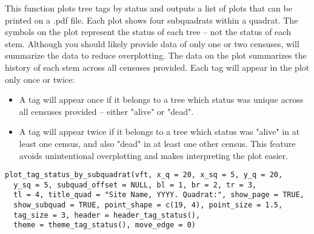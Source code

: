 \documentclass[a4paper]{book}
\begin{document}
\begin{Description}\relax
This function plots tree tags by status and outputs a list of plots that can
be printed on a .pdf file. Each plot shows four subquadrats within a quadrat.
The symbols on the plot represent the status of each tree -- not the status of
each stem. Although you should likely provide data of only one or two
censuses,  will summarize the data to reduce
overplotting. The data on the plot summarizes the history of each stem across
all censuses provided. Each tag will appear in the plot only once or twice:
\begin{itemize}

\item A tag will appear once if it belongs to a tree which status was unique
across all censuses provided -- either "alive" or "dead".
\item A tag will appear twice if it belongs to a tree which status was "alive" in
at least one census, and also "dead" in at least one other census. This
feature avoids unintentional overplotting and makes interpreting the plot
easier.

\end{itemize}

\end{Description}
%
\begin{Usage}
\begin{verbatim}
plot_tag_status_by_subquadrat(vft, x_q = 20, x_sq = 5, y_q = 20,
  y_sq = 5, subquad_offset = NULL, bl = 1, br = 2, tr = 3,
  tl = 4, title_quad = "Site Name, YYYY. Quadrat:", show_page = TRUE,
  show_subquad = TRUE, point_shape = c(19, 4), point_size = 1.5,
  tag_size = 3, header = header_tag_status(),
  theme = theme_tag_status(), move_edge = 0)
\end{verbatim}
\end{Usage}
%
\end{document}
